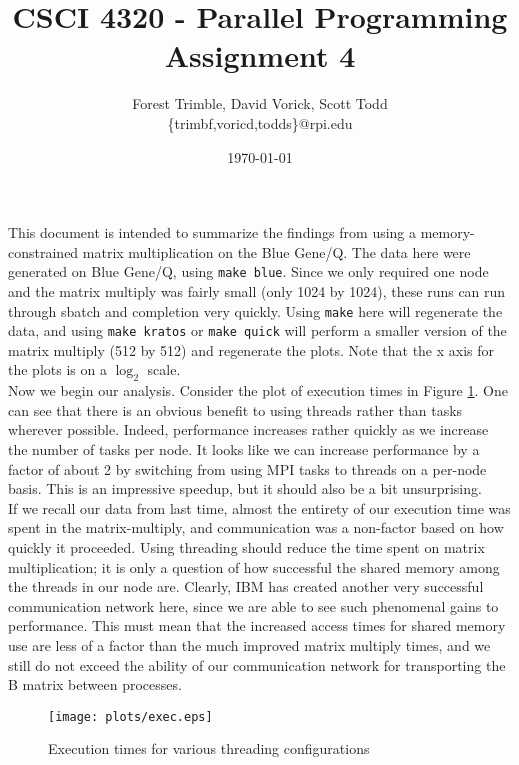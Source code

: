 \documentclass[twocolumn]{article}
\title{CSCI 4320 - Parallel Programming\\Assignment 4}
\author{Forest Trimble, David Vorick, Scott Todd\\\{trimbf,voricd,todds\}@rpi.edu}
\date{\today}
\begin{document}
\maketitle

\pagestyle{fancy}
\fancyhead{}
\fancyhead[R]{\today}

This document is intended to summarize the findings from using a 
memory-constrained matrix multiplication on the Blue Gene/Q. The data here were 
generated on Blue Gene/Q, using \texttt{make blue}. Since we only required one 
node and the matrix multiply was fairly small (only 1024 by 1024), these runs
can run through sbatch and completion very quickly. Using \texttt{make} here will
regenerate the data, and using \texttt{make kratos} or \texttt{make quick} 
will perform a smaller version of the matrix multiply (512 by 512) and regenerate
the plots. Note that the x axis for the plots is on a $\log_2$ scale.\\

Now we begin our analysis. Consider the plot of execution times in Figure 
\ref{fig:exec}. One can see that there is an obvious benefit to using threads 
rather than tasks wherever possible. Indeed, performance increases rather quickly
as we increase the number of tasks per node. It looks like we can increase 
performance by a factor of about 2 by switching from using MPI tasks to threads
on a per-node basis. This is an impressive speedup, but it should also be a bit
unsurprising. \\

If we recall our data from last time, almost the entirety of our 
execution time was spent in the matrix-multiply, and communication was a 
non-factor based on how quickly it proceeded. Using threading should reduce the 
time spent on matrix multiplication; it is only a question of how successful the
shared memory among the threads in our node are. Clearly, IBM has created another
very successful communication network here, since we are able to see such
phenomenal gains to performance. This must mean that the increased access times 
for shared memory use are less of a factor than the much improved matrix multiply
times, and we still do not exceed the ability of our communication network for
transporting the B matrix between processes. \\

\begin{figure}
  \centering
  \texttt{[image: plots/exec.eps]}
  \caption{Execution times for various threading configurations} \label{fig:exec}
\end{figure}
\end{document}
